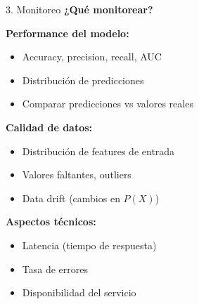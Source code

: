 \documentclass[aspectratio=169]{beamer}
\begin{document}
\begin{frame}{3. Monitoreo}
\textbf{¿Qué monitorear?}

\vspace{0.2cm}

\textbf{Performance del modelo:}
\begin{itemize}
\item Accuracy, precision, recall, AUC
\item Distribución de predicciones
\item Comparar predicciones vs valores reales
\end{itemize}

\vspace{0.2cm}

\textbf{Calidad de datos:}
\begin{itemize}
\item Distribución de features de entrada
\item Valores faltantes, outliers
\item Data drift (cambios en $P(X)$)
\end{itemize}

\vspace{0.2cm}

\textbf{Aspectos técnicos:}
\begin{itemize}
\item Latencia (tiempo de respuesta)
\item Tasa de errores
\item Disponibilidad del servicio
\end{itemize}
\end{frame}
\end{document}
